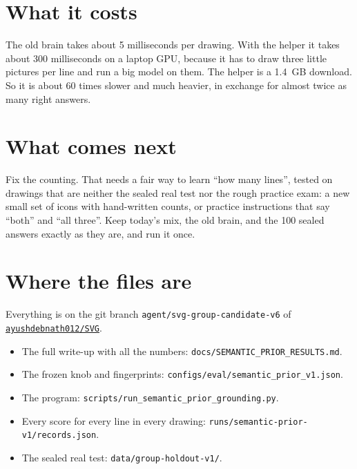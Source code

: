 \documentclass[11pt,a4paper]{article}
\begin{document}
\section*{What it costs}

The old brain takes about 5 milliseconds per drawing.
With the helper it takes about 300 milliseconds on a laptop GPU, because it has to draw three little pictures per line and run a big model on them.
The helper is a 1.4~GB download.
So it is about 60 times slower and much heavier, in exchange for almost twice as many right answers.

\section*{What comes next}

Fix the counting. That needs a fair way to learn ``how many lines'', tested on drawings that are neither the sealed real test nor the rough practice exam: a new small set of icons with hand-written counts, or practice instructions that say ``both'' and ``all three''.
Keep today's mix, the old brain, and the 100 sealed answers exactly as they are, and run it once.

\section*{Where the files are}

Everything is on the git branch \texttt{agent/svg-group-candidate-v6} of \href{https://github.com/ayushdebnath012/SVG}{\texttt{ayushdebnath012/SVG}}.
\begin{itemize}[leftmargin=1.6em]
  \item The full write-up with all the numbers: \texttt{docs/SEMANTIC\_PRIOR\_RESULTS.md}.
  \item The frozen knob and fingerprints: \texttt{configs/eval/semantic\_prior\_v1.json}.
  \item The program: \texttt{scripts/run\_semantic\_prior\_grounding.py}.
  \item Every score for every line in every drawing: \texttt{runs/semantic-prior-v1/records.json}.
  \item The sealed real test: \texttt{data/group-holdout-v1/}.
\end{itemize}
\end{document}
